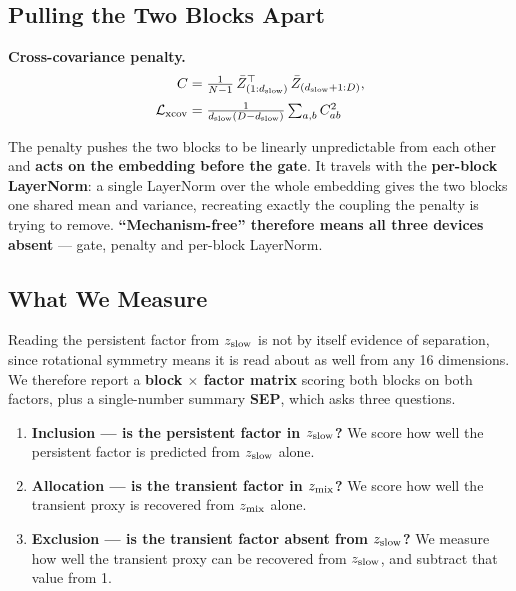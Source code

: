 \subsection{Pulling the Two Blocks Apart}
\label{sec:xcov}

\textbf{Cross-covariance penalty.}
\begin{equation}
\begin{split}
C &= \tfrac{1}{N-1}\,\bar Z^{\top}_{(1:d_{\mathrm{slow}})}\,\bar Z_{(d_{\mathrm{slow}}+1:D)},\\[2pt]
\mathcal{L}_{\text{xcov}} &= \tfrac{1}{d_{\mathrm{slow}} (D-d_{\mathrm{slow}})}\textstyle\sum_{a,b} C_{ab}^{2}
\end{split}
\label{eq:xcov}
\end{equation}

The penalty pushes the two blocks to be linearly unpredictable from each other and \textbf{acts on the embedding before the gate}. It travels with the \textbf{per-block LayerNorm}: a single LayerNorm over the whole embedding gives the two blocks one shared mean and variance, recreating exactly the coupling the penalty is trying to remove. \textbf{``Mechanism-free'' therefore means all three devices absent} --- gate, penalty and per-block LayerNorm.

\subsection{What We Measure}

Reading the persistent factor from $z_{\mathrm{slow}}$ is not by itself evidence of separation, since rotational symmetry means it is read about as well from any 16 dimensions. We therefore report a \textbf{block $\times$ factor matrix} scoring both blocks on both factors, plus a single-number summary \textbf{SEP}, which asks three questions.

\begin{enumerate}
\item \textbf{Inclusion --- is the persistent factor in $z_{\mathrm{slow}}$?} We score how well the persistent factor is predicted from $z_{\mathrm{slow}}$ alone.
\item \textbf{Allocation --- is the transient factor in $z_{\mathrm{mix}}$?} We score how well the transient proxy is recovered from $z_{\mathrm{mix}}$ alone.
\item \textbf{Exclusion --- is the transient factor absent from $z_{\mathrm{slow}}$?} We measure how well the transient proxy can be recovered from $z_{\mathrm{slow}}$, and subtract that value from 1.
\end{enumerate}

